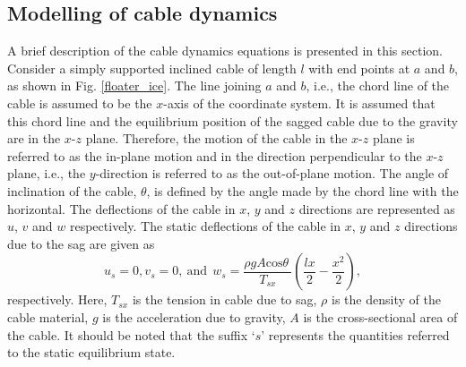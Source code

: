 \documentclass[review]{elsarticle}
\begin{document}

\subsection{Modelling of cable dynamics}
A brief description of the cable dynamics equations is presented in this section.  Consider a simply supported inclined cable of length $l$ with end points at $a$ and $b$, as shown in Fig. \ref{floater_ice}. The line joining $a$ and $b$, i.e., the chord line of the cable is assumed to be the $x$-axis of the coordinate system. It is assumed that this chord line and the equilibrium position of the sagged cable due to the gravity are in the $x$-$z$ plane. Therefore, the motion of the cable in the $x$-$z$ plane is referred to as the in-plane motion and in the direction perpendicular to the $x$-$z$ plane, i.e., the $y$-direction is referred to as the out-of-plane motion. The angle of inclination of the cable, $\theta$, is defined by the angle made by the chord line with the horizontal. The deflections of the cable in $x$, $y$ and $z$ directions are represented as $u$, $v$ and $w$ respectively. The static deflections of the cable in $x$, $y$ and $z$ directions due to the sag are given as
\begin{equation} \label{GrindEQ__3_} 
u_s=0,v_s=0, ~\mbox{and}~ \ w_s=\frac{\rho g{A\mathrm{cos} \theta \ }}{T_{sx}}\left(\frac{lx}{2}-\frac{x^2}{2}\right),              
\end{equation} 
respectively. Here, $T_{sx}$ is the tension in cable due to sag, $\rho $ is the density of the cable material, $g$ is the acceleration due to gravity, $A$ is the cross-sectional area of the cable.  It should be noted that the suffix `$s$' represents the quantities referred to the static equilibrium state.
\end{document}

